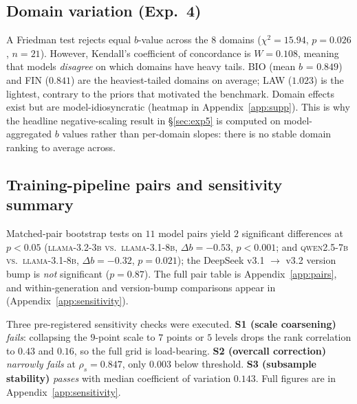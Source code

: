 \documentclass{article}
\newcommand{\sdi}{\ensuremath{b}}
\begin{document}

\subsection{Domain variation (Exp.\ 4)}\label{sec:exp4}
A Friedman test rejects equal $b$-value across the 8 domains
($\chi^2 = 15.94$, $p = 0.026$, $n = 21$). However, Kendall's
coefficient of concordance is \textbf{$W = 0.108$}, meaning that models
\emph{disagree} on which domains have heavy tails. BIO (mean $b$ =
$0.849$) and FIN ($0.841$) are the heaviest-tailed domains on average;
LAW ($1.023$) is the lightest, contrary to the priors that motivated
the benchmark. Domain effects exist but are model-idiosyncratic
(heatmap in Appendix~\ref{app:supp}). This is why the headline
negative-scaling result in \S\ref{sec:exp5} is computed on
model-aggregated \sdi{} values rather than per-domain slopes:
there is no stable domain ranking to average across.


\subsection{Training-pipeline pairs and sensitivity
summary}\label{sec:sensitivity}

Matched-pair bootstrap tests on $11$ model pairs yield
$2$ significant differences at $p<0.05$
(\textsc{llama-3.2-3b vs.\ llama-3.1-8b}, $\Delta\sdi = -0.53$,
$p<0.001$; and \textsc{qwen2.5-7b vs.\ llama-3.1-8b},
$\Delta\sdi = -0.32$, $p = 0.021$); the DeepSeek v3.1 $\to$ v3.2
version bump is \emph{not} significant ($p = 0.87$). The full pair
table is Appendix~\ref{app:pairs}, and within-generation and
version-bump comparisons appear in 
(Appendix~\ref{app:sensitivity}).

Three pre-registered sensitivity checks were executed. \textbf{S1
(scale coarsening)} \emph{fails}: collapsing the $9$-point scale to
$7$ points or $5$ levels drops the rank correlation to $0.43$ and
$0.16$, so the full grid is load-bearing. \textbf{S2 (overcall
correction)} \emph{narrowly fails} at $\rho_s = 0.847$, only
$0.003$ below threshold. \textbf{S3 (subsample stability)}
\emph{passes} with median coefficient of variation $0.143$. Full
figures are in Appendix~\ref{app:sensitivity}.
\end{document}
